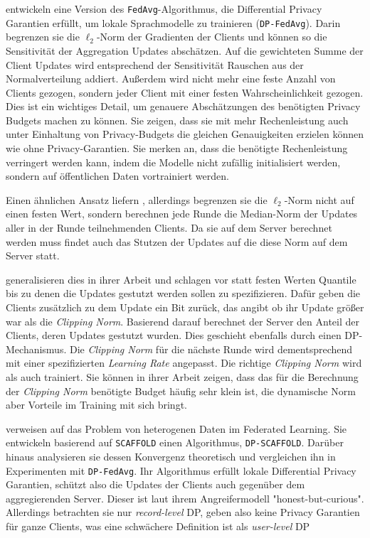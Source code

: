 \textcite{mcmahan:2018} entwickeln eine Version des \texttt{FedAvg}-Algorithmus, die Differential Privacy Garantien erfüllt, um lokale Sprachmodelle zu trainieren (\texttt{DP-FedAvg}). Darin begrenzen sie die $\ell_2$-Norm der Gradienten der Clients und können so die Sensitivität der Aggregation Updates abschätzen. Auf die gewichteten Summe der Client Updates wird entsprechend der Sensitivität Rauschen aus der Normalverteilung addiert. Außerdem wird nicht mehr eine feste Anzahl von Clients gezogen, sondern jeder Client mit einer festen Wahrscheinlichkeit gezogen. Dies ist ein wichtiges Detail, um genauere Abschätzungen des benötigten Privacy Budgets machen zu können\cite{wang:2020}. Sie zeigen, dass sie mit mehr Rechenleistung auch unter Einhaltung von Privacy-Budgets die gleichen Genauigkeiten erzielen können wie ohne Privacy-Garantien. Sie merken an, dass die benötigte Rechenleistung verringert werden kann, indem die Modelle nicht zufällig initialisiert werden, sondern auf öffentlichen Daten vortrainiert werden.

Einen ähnlichen Ansatz liefern \textcite{geyer:2017}, allerdings begrenzen sie die $\ell_2$-Norm nicht auf einen festen Wert, sondern berechnen jede Runde die Median-Norm der Updates aller in der Runde teilnehmenden Clients. Da sie auf dem Server berechnet werden muss findet auch das Stutzen der Updates auf die diese Norm auf dem Server statt. 

\textcite{andrew:2021} generalisieren dies in ihrer Arbeit und schlagen vor statt festen Werten Quantile bis zu denen die Updates gestutzt werden sollen zu spezifizieren. Dafür geben die Clients zusätzlich zu dem Update ein Bit zurück, das angibt ob ihr Update größer war als die \textit{Clipping Norm}. Basierend darauf berechnet der Server den Anteil der Clients, deren Updates gestutzt wurden. Dies geschieht ebenfalls durch einen DP-Mechanismus. Die \textit{Clipping Norm} für die nächste Runde wird dementsprechend mit einer spezifizierten \textit{Learning Rate} angepasst. Die richtige \textit{Clipping Norm} wird als auch trainiert. Sie können in ihrer Arbeit zeigen, dass das für die Berechnung der \textit{Clipping Norm} benötigte Budget häufig sehr klein ist, die dynamische Norm aber Vorteile im Training mit sich bringt.

\textcite{noble:2023} verweisen auf das Problem von heterogenen Daten im Federated Learning. Sie entwickeln basierend auf \texttt{SCAFFOLD} einen Algorithmus, \texttt{DP-SCAFFOLD}. Darüber hinaus analysieren sie dessen Konvergenz theoretisch und vergleichen ihn in Experimenten mit \texttt{DP-FedAvg}. Ihr Algorithmus erfüllt lokale Differential Privacy Garantien, schützt also die Updates der Clients auch gegenüber dem aggregierenden Server. Dieser ist laut ihrem Angreifermodell "honest-but-curious". Allerdings betrachten sie nur \textit{record-level} DP, geben also keine Privacy Garantien für ganze Clients, was eine schwächere Definition ist als \textit{user-level} DP\cite[p.44]{kairouz:2021}

